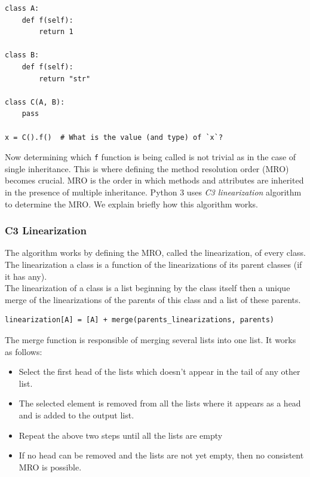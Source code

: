 \begin{lstlisting}
class A:
	def f(self):
		return 1

class B:
	def f(self):
		return "str"
		
class C(A, B):
	pass
	
x = C().f()  # What is the value (and type) of `x`?
\end{lstlisting}

Now determining which \lstinline|f| function is being called is not trivial as in the case of single inheritance. This is where defining the method resolution order (MRO) becomes crucial. MRO is the order in which methods and attributes are inherited in the presence of multiple inheritance. Python 3 uses \textit{C3 linearization} algorithm to determine the MRO. We explain briefly how this algorithm works.

\subsubsection{C3 Linearization}
The algorithm works by defining the MRO, called the linearization, of every class. The linearization a class is a function of the linearizations of its parent classes (if it has any). \\

The linearization of a class is a list beginning by the class itself then a unique merge of the linearizations of the parents of this class and a list of these parents.

\begin{lstlisting}
linearization[A] = [A] + merge(parents_linearizations, parents)
\end{lstlisting}

The merge function is responsible of merging several lists into one list. It works as follows:

\begin{itemize}
	\item Select the first head of the lists which doesn't appear in the tail of any other list.
	\item The selected element is removed from all the lists where it appears as a head and is added to the output list.
	\item Repeat the above two steps until all the lists are empty
	\item If no head can be removed and the lists are not yet empty, then no consistent MRO is possible.
\end{itemize}

